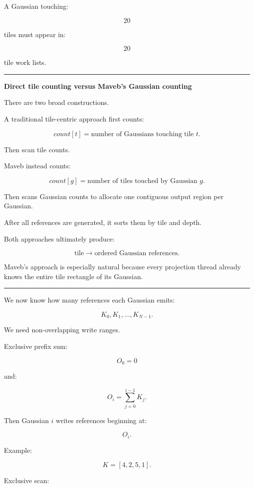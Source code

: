 A Gaussian touching:

\[
20
\]

tiles must appear in:

\[
20
\]

tile work lists.

\begin{center}\rule{0.5\linewidth}{0.5pt}\end{center}

\textbf{Direct tile counting versus Maveb's Gaussian counting}

There are two broad constructions.

A traditional tile-centric approach first counts:

\[
count[t]
=
\text{number of Gaussians touching tile }t.
\]

Then scan tile counts.

Maveb instead counts:

\[
count[g]
=
\text{number of tiles touched by Gaussian }g.
\]

Then scans Gaussian counts to allocate one contiguous output region per Gaussian.

After all references are generated, it sorts them by tile and depth.

Both approaches ultimately produce:

\[
\text{tile}\rightarrow
\text{ordered Gaussian references}.
\]

Maveb's approach is especially natural because every projection thread already knows the entire tile rectangle of its Gaussian.

\begin{center}\rule{0.5\linewidth}{0.5pt}\end{center}

We now know how many references each Gaussian emits:

\[
K_0,K_1,\ldots,K_{N-1}.
\]

We need non-overlapping write ranges.

Exclusive prefix sum:

\[
O_0=0
\]

and:

\[
\boxed{
O_i=
\sum_{j=0}^{i-1}K_j.
}
\]

Then Gaussian \(i\) writes references beginning at:

\[
O_i.
\]

Example:

\[
K=
[4,2,5,1].
\]

Exclusive scan:

